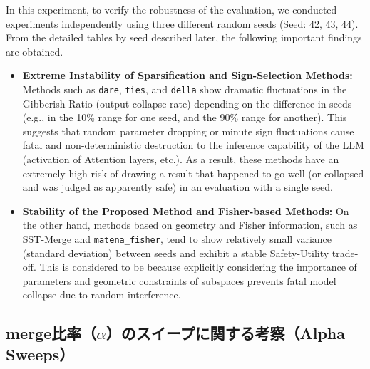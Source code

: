 \documentclass{article}
\begin{document}
In this experiment, to verify the robustness of the evaluation, we conducted experiments independently using three different random seeds (Seed: 42, 43, 44). From the detailed tables by seed described later, the following important findings are obtained.

\begin{itemize}
    \item \textbf{Extreme Instability of Sparsification and Sign-Selection Methods:} Methods such as \texttt{dare}, \texttt{ties}, and \texttt{della} show dramatic fluctuations in the Gibberish Ratio (output collapse rate) depending on the difference in seeds (e.g., in the 10\% range for one seed, and the 90\% range for another). This suggests that random parameter dropping or minute sign fluctuations cause fatal and non-deterministic destruction to the inference capability of the LLM (activation of Attention layers, etc.). As a result, these methods have an extremely high risk of drawing a result that happened to go well (or collapsed and was judged as apparently safe) in an evaluation with a single seed.
    \item \textbf{Stability of the Proposed Method and Fisher-based Methods:} On the other hand, methods based on geometry and Fisher information, such as SST-Merge and \texttt{matena\_fisher}, tend to show relatively small variance (standard deviation) between seeds and exhibit a stable Safety-Utility trade-off. This is considered to be because explicitly considering the importance of parameters and geometric constraints of subspaces prevents fatal model collapse due to random interference.
\end{itemize}

\subsection{merge比率（$\alpha$）のスイープに関する考察（Alpha Sweeps）}

\end{document}
